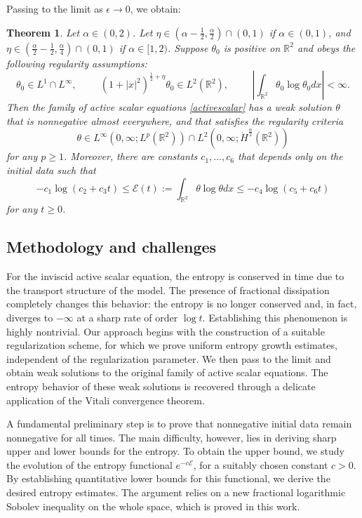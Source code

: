 \documentclass[12pt,reqno]{amsart}
\newcommand{\be}{\begin{equation}}
\newcommand{\ee}{\end{equation}}
\newtheorem{thm}{Theorem}[section]
\newcommand{\R}{\mathbb R}
\def\RR{{\mathbb R}}
\begin{document}
Passing to the limit as $\epsilon \rightarrow 0$, we obtain:

\begin{thm} \label{t2}
Let $\alpha \in (0,2)$. Let $\eta \in \left(\alpha - \frac{1}{2}, \frac{\alpha}{2} \right) \cap (0,1)$ if $\alpha \in (0,1)$, and $\eta \in \left(\frac{\alpha}{2} - \frac{1}{2}, \frac{\alpha}{4} \right) \cap (0,1)$ if $\alpha \in [1,2)$.
Suppose $\theta_0$ is positive on $\R^2$ and obeys the following regularity assumptions:
\be 
\theta_0 \in L^1 \cap L^{\infty}, \hspace{1cm}  (1+|x|^2)^{\frac{1}{2}+\eta} \theta_0 \in L^2(\R^2), \hspace{1cm} \left|\int_{\R^2} \theta_0 \log \theta_0 dx\right| <\infty.   
\ee  Then the family of active scalar equations \eqref{activescalar} has a weak solution $\theta$ that is nonnegative almost everywhere, and that satisfies the regularity criteria 
\be 
\theta \in L^{\infty}(0,\infty; L^p(\RR^2)) \cap L^2(0, \infty; \dot{H}^{\frac{\alpha}{2}}(\R^2))
\ee for any $p \ge 1$. Moreover, there are constants $c_1, \dots, c_6$ that depends only on the initial data such that 
\be 
-c_1 \log (c_2+c_3t) \le \mathcal{E}(t):= \int_{\R^2} \theta \log \theta dx \le -c_4 \log (c_5+c_6t)
\ee for any $t \ge 0$.
\end{thm}


\subsection{Methodology and challenges} For the inviscid active scalar equation, the entropy is conserved in time due to the transport structure of the model. The presence of fractional dissipation completely changes this behavior: the entropy is no longer conserved and, in fact, diverges to $-\infty$ at a sharp rate of order $\log t$. Establishing this phenomenon is highly nontrivial. Our approach begins with the construction of a suitable regularization scheme, for which we prove uniform entropy growth estimates, independent of the regularization parameter. We then pass to the limit and obtain weak solutions to the original family of active scalar equations. The entropy behavior of these weak solutions is recovered through a delicate application of the Vitali convergence theorem.

A fundamental preliminary step is to prove that nonnegative initial data remain nonnegative for all times. The main difficulty, however, lies in deriving sharp upper and lower bounds for the entropy. To obtain the upper bound, we study the evolution of the entropy functional $e^{-c\mathcal E}$, for a suitably chosen constant $c>0$. By establishing quantitative lower bounds for this functional, we derive the desired entropy estimates. The argument relies on a new fractional logarithmic Sobolev inequality on the whole space, which is proved in this work.
\end{document}
